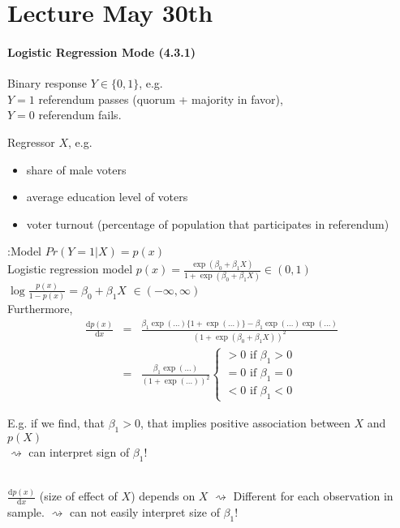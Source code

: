 \documentclass[11pt,a4paper,numbers=endperiod]{scrartcl}
\newcommand{\id}{\hspace*{4mm}}
\newcommand{\dif}{\mathrm{d}}
\newcommand{\tit}[1]{\begin{large} \underline{\text{#1}}\end{large}}
\begin{document}
{\section{Lecture May 30th} 

\paragraph{Logistic Regression Mode (4.3.1)}
$ $\\

Binary response $Y \in \{0, 1\}$, e.g.\\
 $Y = 1$ referendum passes (quorum + majority in favor),\\
 $Y = 0$ referendum fails.

Regressor $X$, e.g. \begin{itemize}
	\item share of male voters
	\item average education level of voters
	\item voter turnout (percentage of population that participates in referendum) 
\end{itemize}

\tit{Aim}:\id Model $Pr(Y= 1|X) = p(x)$\\
\id Logistic regression model $p(x) = \frac{\exp(\beta_0 + \beta_1 X)}{1 + \exp(\beta_0 + \beta_1 X)} \in (0,1)$\\
\id $\log \frac{p(x)}{1 - p(x)} = \beta_0 + \beta_1 X$ $\in (-\infty, \infty)$\\

Furthermore, \begin{eqnarray*}
	\frac{\dif p(x)}{\dif x} &=& \frac{\beta_1 \exp(\ldots) \{1 + \exp(\ldots)\} - \beta_1 \exp(\ldots) \exp(\ldots)}{(1 + \exp(\beta_0 + \beta_1X))^2}\\
	&=& \frac{\beta_1 \exp(\ldots)}{(1+ \exp(\ldots))^2}  \begin{cases}
	 > 0 \text{ if } \beta_1 > 0\\
	 = 0 \text{ if } \beta_1 = 0\\
	 < 0 \text{ if } \beta_1 < 0
\end{cases}
\end{eqnarray*}

E.g. if we find, that $\beta_1 > 0$, that implies positive association between $X$ and $p(X)$\\
$\rightsquigarrow$ can interpret sign of $\beta_1$!\\
\tit{Note:}\\
$\frac{\dif p(x)}{\dif x}$ (size of effect of $X$) depends on $X$ $\rightsquigarrow$ Different for each observation in sample. $\rightsquigarrow$ can not easily interpret size of $\beta_1$!\\
\newpage
}
\end{document}

